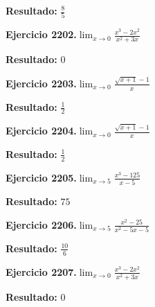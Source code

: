 \documentclass[10pt,a4paper]{article}
\begin{document}
\begin{solbox}
\textbf{Resultado:} \(\displaystyle \frac{8}{5}\)
\end{solbox}

\begin{ejbox}
\textbf{Ejercicio 2202.}\quad $\lim_{x\to 0} \frac{x^3-2x^2}{x^2+3x}$
\end{ejbox}

\begin{solbox}
\textbf{Resultado:} \(\displaystyle 0\)
\end{solbox}

\begin{ejbox}
\textbf{Ejercicio 2203.}\quad $\lim_{x\to 0} \frac{\sqrt{x+1}-1}{x}$
\end{ejbox}

\begin{solbox}
\textbf{Resultado:} \(\displaystyle \frac{1}{2}\)
\end{solbox}

\newpage
\begin{ejbox}
\textbf{Ejercicio 2204.}\quad $\lim_{x\to 0} \frac{\sqrt{x+1}-1}{x}$
\end{ejbox}

\begin{solbox}
\textbf{Resultado:} \(\displaystyle \frac{1}{2}\)
\end{solbox}

\begin{ejbox}
\textbf{Ejercicio 2205.}\quad $\lim_{x\to 5} \frac{x^3-125}{x-5}$
\end{ejbox}

\begin{solbox}
\textbf{Resultado:} \(\displaystyle 75\)
\end{solbox}

\begin{ejbox}
\textbf{Ejercicio 2206.}\quad $\lim_{x\to 5} \frac{x^2-25}{x^2-5x-5}$
\end{ejbox}

\begin{solbox}
\textbf{Resultado:} \(\displaystyle \frac{10}{6}\)
\end{solbox}

\newpage
\begin{ejbox}
\textbf{Ejercicio 2207.}\quad $\lim_{x\to 0} \frac{x^3-2x^2}{x^2+3x}$
\end{ejbox}

\begin{solbox}
\textbf{Resultado:} \(\displaystyle 0\)
\end{solbox}
\end{document}
